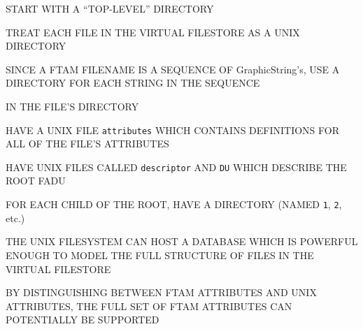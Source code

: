 \begin{bwslide}

\begin{nrtc}
\item	START WITH A ``TOP-LEVEL'' DIRECTORY

\item	TREAT EACH FILE IN THE VIRTUAL FILESTORE AS A UNIX DIRECTORY
    \begin{nrtc}
    \item	SINCE A FTAM FILENAME IS A SEQUENCE OF GraphicString's,
		USE A DIRECTORY FOR EACH STRING IN THE SEQUENCE
    \end{nrtc}

\item	IN THE FILE'S DIRECTORY
    \begin{nrtc}
    \item	HAVE A UNIX FILE \verb"attributes" WHICH CONTAINS
		DEFINITIONS FOR ALL OF THE FILE'S ATTRIBUTES

    \item	HAVE UNIX FILES CALLED \verb"descriptor" AND \verb"DU"
		WHICH DESCRIBE THE ROOT FADU

    \item	FOR EACH CHILD OF THE ROOT, HAVE A DIRECTORY
		(NAMED \verb"1", \verb"2", etc.)
    \end{nrtc}
\end{nrtc}
\end{bwslide}




\begin{bwslide}
\end{bwslide}


\begin{bwslide}

\begin{nrtc}
\item	THE UNIX FILESYSTEM CAN HOST A DATABASE WHICH IS POWERFUL ENOUGH TO
	MODEL THE FULL STRUCTURE OF FILES IN THE VIRTUAL FILESTORE

\item	BY DISTINGUISHING BETWEEN FTAM ATTRIBUTES AND UNIX ATTRIBUTES,
	THE FULL SET OF FTAM ATTRIBUTES CAN POTENTIALLY BE SUPPORTED
\end{nrtc}
\end{bwslide}


